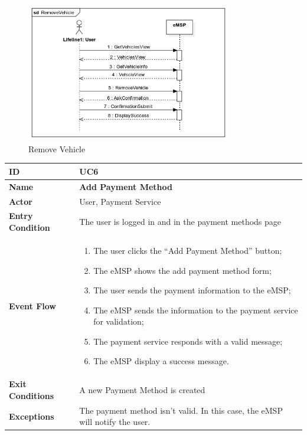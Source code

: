 \documentclass{Configuration_Files/PoliMi3i_thesis}
\begin{document}
\begin{figure}[H]
    \centering
    \includegraphics[width=0.8\textwidth]{Images/UseCases/RemoveVehicle.jpg}
    \caption{Remove Vehicle}
\end{figure}


\newpage\begin{table}[H]
    \begin{xltabular}{\textwidth}{| >{}l | X |}
    \hline
    \textbf{ID} & \textbf{UC6}\T\B\\
    \hline
    \textbf{Name} & \textbf{Add Payment Method}\T\B\\
    \hline \hline
    \textbf{Actor} & User, Payment Service\T\B \\
    \hline
    \textbf{Entry Condition} & The user is logged in and in the payment methods page\T\B\\
    \hline
    \textbf{Event Flow} & 
        \begin{enumerate}
        \item The user clicks the “Add Payment Method” button;
        \item The eMSP shows the add payment method form;
        \item The user sends the payment information to the eMSP;
        \item The eMSP sends the information to the payment service for validation;
        \item The payment service responds with a valid message;
        \item The eMSP display a success message.
        \end{enumerate}\B\\
    \hline
    \textbf{Exit Conditions} & A new Payment Method is created\B\\
    \hline
    \textbf{Exceptions} & The payment method isn't valid. In this case, the eMSP will notify the user.\B\\
    \hline
    \end{xltabular}
\end{table}
\end{document}
